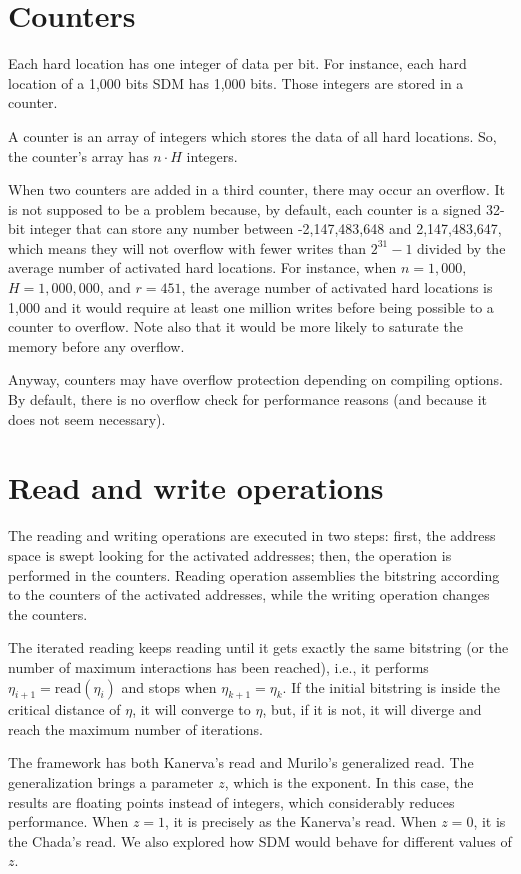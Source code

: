 \section{Counters}

Each hard location has one integer of data per bit. For instance, each hard location of a 1,000 bits SDM has 1,000 bits. Those integers are stored in a counter.

A counter is an array of integers which stores the data of all hard locations. So, the counter's array has $n \cdot H$ integers.

When two counters are added in a third counter, there may occur an overflow. It is not supposed to be a problem because, by default, each counter is a signed 32-bit integer that can store any number between -2,147,483,648 and 2,147,483,647, which means they will not overflow with fewer writes than $2^{31}-1$ divided by the average number of activated hard locations. For instance, when $n=1,000$, $H=1,000,000$, and $r=451$, the average number of activated hard locations is 1,000 and it would require at least one million writes before being possible to a counter to overflow.  Note also that it would be more likely to saturate the memory before any overflow.

Anyway, counters may have overflow protection depending on compiling options. By default, there is no overflow check for performance reasons (and because it does not seem necessary).

\section{Read and write operations}

The reading and writing operations are executed in two steps: first, the address space is swept looking for the activated addresses; then, the operation is performed in the counters. Reading operation assemblies the bitstring according to the counters of the activated addresses, while the writing operation changes the counters.

The iterated reading keeps reading until it gets exactly the same bitstring (or the number of maximum interactions has been reached), i.e., it performs $\eta_{i+1} = \text{read}(\eta_i)$ and stops when $\eta_{k+1} = \eta_{k}$. If the initial bitstring is inside the critical distance of $\eta$, it will converge to $\eta$, but, if it is not, it will diverge and reach the maximum number of iterations.

The framework has both Kanerva's read and Murilo's generalized read. The generalization brings a parameter $z$, which is the exponent. In this case, the results are floating points instead of integers, which considerably reduces performance. When $z=1$, it is precisely as the Kanerva's read. When $z=0$, it is the Chada's read. We also explored how SDM would behave for different values of $z$.

